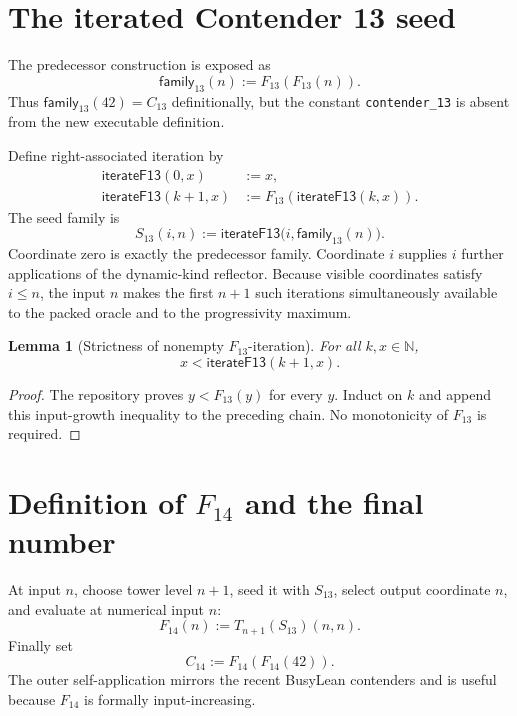 \documentclass[11pt]{article}
\newtheorem{lemma}[theorem]{Lemma}
\theoremstyle{definition}
\newcommand{\Nat}{\ensuremath{\mathbb{N}}}
\newcommand{\lean}[1]{\texttt{#1}}
\begin{document}
\section{The iterated Contender 13 seed}

The predecessor construction is exposed as
\[
  \mathsf{family}_{13}(n):=F_{13}(F_{13}(n)).
\]
Thus $\mathsf{family}_{13}(42)=C_{13}$ definitionally, but the constant
\lean{contender\_13} is absent from the new executable definition.

Define right-associated iteration by
\begin{align*}
  \mathsf{iterateF13}(0,x)&:=x,\\
  \mathsf{iterateF13}(k+1,x)&:=F_{13}(\mathsf{iterateF13}(k,x)).
\end{align*}
The seed family is
\begin{equation}
  S_{13}(i,n):=
  \mathsf{iterateF13}\bigl(i,\mathsf{family}_{13}(n)\bigr).
\label{eq:seed13}
\end{equation}
Coordinate zero is exactly the predecessor family.  Coordinate $i$ supplies
$i$ further applications of the dynamic-kind reflector.  Because visible
coordinates satisfy $i\le n$, the input $n$ makes the first $n+1$ such
iterations simultaneously available to the packed oracle and to the
progressivity maximum.

\begin{lemma}[Strictness of nonempty \(F_{13}\)-iteration]
For all $k,x\in\Nat$,
\[
  x<\mathsf{iterateF13}(k+1,x).
\]
\end{lemma}
\begin{proof}
The repository proves $y<F_{13}(y)$ for every $y$.  Induct on $k$ and append
this input-growth inequality to the preceding chain.  No monotonicity of
$F_{13}$ is required.
\end{proof}

\section{\texorpdfstring{Definition of \(F_{14}\) and the final number}{Definition of F14 and the final number}}

At input $n$, choose tower level $n+1$, seed it with $S_{13}$, select output
coordinate $n$, and evaluate at numerical input $n$:
\begin{equation}
  F_{14}(n):=T_{n+1}(S_{13})(n,n).
\label{eq:F14}
\end{equation}
Finally set
\begin{equation}
  C_{14}:=F_{14}(F_{14}(42)).
\label{eq:C14}
\end{equation}
The outer self-application mirrors the recent BusyLean contenders and is useful
because $F_{14}$ is formally input-increasing.
\end{document}
